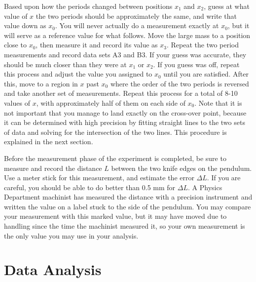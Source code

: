 \documentclass{revtex4}
\begin{document}
Based upon how the periods changed between positions $x_1$ and $x_2$,
guess at what value of $x$ the two periods should be approximately the
same, and write that value down as $x_0$.  You will never actually do
a measurement exactly at $x_0$, but it will serve as a reference value
for what follows. Move the large mass to a position close to $x_0$,
then measure it and record its value as $x_3$.
Repeat the two period measurements and record data sets A3 and B3.
If your guess was accurate, they should be much closer than they were
at $x_1$ or $x_2$.  If you guess was off, repeat this process and adjust
the value you assigned to $x_0$ until you are satisfied.  After this,
move to a region in $x$ past $x_0$ where the order of the two periods
is reversed and take another set of measurements.  Repeat this process
for a total of 8-10 values of $x$, with approximately half of them
on each side of $x_0$.  Note that it is not important that you manage
to land exactly on the cross-over point, because it can be determined
with high precision by fitting straight lines to the two sets of data
and solving for the intersection of the two lines.  This procedure is
explained in the next section.

Before the measurement phase of the experiment is completed, be sure to
measure and record the distance $L$ between the two knife edges on the
pendulum.  Use a meter stick for this measurement, and estimate the
error $\Delta L$.  If you are careful, you should be able to do better
than 0.5 mm for $\Delta L$.  A Physics Department machinist has measured
the distance with a precision instrument and written the value on a label
stuck to the side of the pendulum.  You may compare your measurement 
with this marked value, but it may have moved due to handling since the
time the machinist measured it, so your own measurement is the only value
you may use in your analysis.

\section{Data Analysis}
\end{document}
